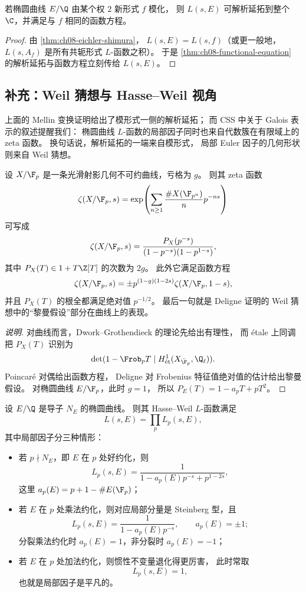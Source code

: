 \begin{corollary}
\label{cor:ch08-elliptic-analytic-continuation}
若椭圆曲线 $E/\Q$ 由某个权 $2$ 新形式 $f$ 模化，
则 $L(s,E)$ 可解析延拓到整个 $\C$，并满足与 $f$ 相同的函数方程。
\end{corollary}

\begin{proof}
由 \cref{thm:ch08-eichler-shimura}，
$L(s,E)=L(s,f)$（或更一般地，$L(s,A_f)$ 是所有共轭形式 $L$-函数之积）。
于是 \cref{thm:ch08-functional-equation} 的解析延拓与函数方程立刻传给 $L(s,E)$。
\end{proof}

\subsection*{补充：Weil 猜想与 Hasse--Weil 视角}
上面的 Mellin 变换证明给出了模形式一侧的解析延拓；
而 CSS 中关于 Galois 表示的叙述提醒我们：
椭圆曲线 $L$-函数的局部因子同时也来自代数簇在有限域上的 zeta 函数。
换句话说，解析延拓的一端来自模形式，
局部 Euler 因子的几何形状则来自 Weil 猜想。

\begin{theorem}
\label{thm:ch08-weil-conjectures-curves}
设 $X/\F_p$ 是一条光滑射影几何不可约曲线，亏格为 $g$。
则其 zeta 函数
\[
  \zeta(X/\F_p,s)
  =\exp\!\left(\sum_{n\ge1}\frac{\#X(\F_{p^n})}{n}p^{-ns}\right)
\]
可写成
\[
  \zeta(X/\F_p,s)=\frac{P_X(p^{-s})}{(1-p^{-s})(1-p^{1-s})},
\]
其中 $P_X(T)\in 1+T\Z[T]$ 的次数为 $2g$。
此外它满足函数方程
\[
  \zeta(X/\F_p,s)=\pm p^{(1-g)(1-2s)}\zeta(X/\F_p,1-s),
\]
并且 $P_X(T)$ 的根全都满足绝对值 $p^{-1/2}$。
最后一句就是 Deligne 证明的 Weil 猜想中的“黎曼假设”部分在曲线上的表现。
\end{theorem}

\begin{proof}[说明]
对曲线而言，Dwork--Grothendieck 的理论先给出有理性，
而 \'{e}tale 上同调把 $P_X(T)$ 识别为
\[
  \det(1-\Frob_pT\mid H^1_{\text{\'{e}t}}(X_{\bar\F_p},\Q_\ell)).
\]
Poincar\'{e} 对偶给出函数方程，
Deligne 对 Frobenius 特征值绝对值的估计给出黎曼假设。
对椭圆曲线 $E/\F_p$，此时 $g=1$，
所以 $P_E(T)=1-a_pT+pT^2$。
\end{proof}

\begin{proposition}
\label{prop:ch08-local-factors-elliptic}
设 $E/\Q$ 是导子 $N_E$ 的椭圆曲线。
则其 Hasse--Weil $L$-函数满足
\[
  L(s,E)=\prod_p L_p(s,E),
\]
其中局部因子分三种情形：
\begin{itemize}
  \item 若 $p\nmid N_E$，即 $E$ 在 $p$ 处好约化，则
  \[
    L_p(s,E)=\frac{1}{1-a_p(E)p^{-s}+p^{1-2s}},
  \]
  这里 $a_p(E)=p+1-\#E(\F_p)$；
  \item 若 $E$ 在 $p$ 处乘法约化，则对应局部分量是 Steinberg 型，且
  \[
    L_p(s,E)=\frac{1}{1-a_p(E)p^{-s}},
    \qquad a_p(E)=\pm 1;
  \]
  分裂乘法约化时 $a_p(E)=1$，非分裂时 $a_p(E)=-1$；
  \item 若 $E$ 在 $p$ 处加法约化，则惯性不变量退化得更厉害，
  此时常取
  \[
    L_p(s,E)=1,
  \]
  也就是局部因子是平凡的。
\end{itemize}
\end{proposition}

